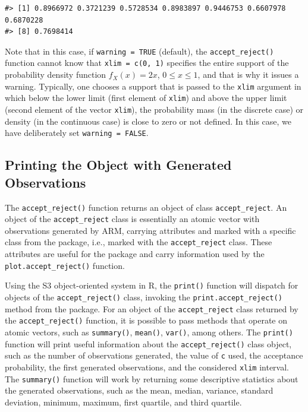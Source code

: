\begin{verbatim}
#> [1] 0.8966972 0.3721239 0.5728534 0.8983897 0.9446753 0.6607978 0.6870228
#> [8] 0.7698414
\end{verbatim}

Note that in this case, if \texttt{warning\ =\ TRUE} (default), the \texttt{accept\_reject()} function cannot know that \texttt{xlim\ =\ c(0,\ 1)} specifies the entire support of the probability density function \(f_X(x) = 2x\), \(0 \leq x \leq 1\), and that is why it issues a warning. Typically, one chooses a support that is passed to the \texttt{xlim} argument in which below the lower limit (first element of \texttt{xlim}) and above the upper limit (second element of the vector \texttt{xlim}), the probability mass (in the discrete case) or density (in the continuous case) is close to zero or not defined. In this case, we have deliberately set \texttt{warning\ =\ FALSE}.

\subsection{Printing the Object with Generated Observations}\label{printing-the-object-with-generated-observations}

The \texttt{accept\_reject()} function returns an object of class \texttt{accept\_reject}. An object of the \texttt{accept\_reject} class is essentially an atomic vector with observations generated by ARM, carrying attributes and marked with a specific class from the  package, i.e., marked with the \texttt{accept\_reject} class. These attributes are useful for the package and carry information used by the \texttt{plot.accept\_reject()} function.

Using the S3 object-oriented system in R, the \texttt{print()} function will dispatch for objects of the \texttt{accept\_reject()} class, invoking the \texttt{print.accept\_reject()} method from the  package. For an object of the \texttt{accept\_reject} class returned by the \texttt{accept\_reject()} function, it is possible to pass methods that operate on atomic vectors, such as \texttt{summary()}, \texttt{mean()}, \texttt{var()}, among others. The \texttt{print()} function will print useful information about the \texttt{accept\_reject()} class object, such as the number of observations generated, the value of \texttt{c} used, the acceptance probability, the first generated observations, and the considered \texttt{xlim} interval. The \texttt{summary()} function will work by returning some descriptive statistics about the generated observations, such as the mean, median, variance, standard deviation, minimum, maximum, first quartile, and third quartile.

